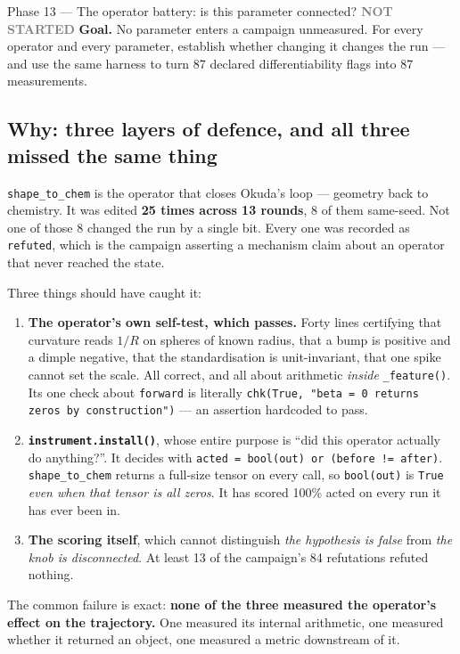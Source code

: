 \documentclass[11pt,a4paper]{article}
\newcommand{\code}[1]{\texttt{#1}}
\newcommand{\todo}{\textcolor{grey}{\textbf{NOT STARTED}}}
\begin{document}
\begin{phasebox}{Phase 13 --- The operator battery: is this parameter connected? \hfill \todo}
\textbf{Goal.} No parameter enters a campaign unmeasured. For every operator and every parameter,
establish whether changing it changes the run --- and use the same harness to turn 87 declared
differentiability flags into 87 measurements.

\subsection*{Why: three layers of defence, and all three missed the same thing}
\code{shape\_to\_chem} is the operator that closes Okuda's loop --- geometry back to chemistry. It
was edited \textbf{25 times across 13 rounds}, 8 of them same-seed. Not one of those 8 changed the
run by a single bit. Every one was recorded as \code{refuted}, which is the campaign asserting a
mechanism claim about an operator that never reached the state.

Three things should have caught it:

\begin{enumerate}[leftmargin=1.4em]
\item \textbf{The operator's own self-test, which passes.} Forty lines certifying that curvature
reads $1/R$ on spheres of known radius, that a bump is positive and a dimple negative, that the
standardisation is unit-invariant, that one spike cannot set the scale. All correct, and all about
arithmetic \emph{inside} \code{\_feature()}. Its one check about \code{forward} is literally
\code{chk(True, "beta = 0 returns zeros by construction")} --- an assertion hardcoded to pass.
\item \textbf{\code{instrument.install()}}, whose entire purpose is ``did this operator actually do
anything?''. It decides with \code{acted = bool(out) or (before != after)}. \code{shape\_to\_chem}
returns a full-size tensor on every call, so \code{bool(out)} is \code{True} \emph{even when that
tensor is all zeros}. It has scored 100\% acted on every run it has ever been in.
\item \textbf{The scoring itself}, which cannot distinguish \emph{the hypothesis is false} from
\emph{the knob is disconnected}. At least 13 of the campaign's 84 refutations refuted nothing.
\end{enumerate}

\noindent The common failure is exact: \textbf{none of the three measured the operator's effect on
the trajectory.} One measured its internal arithmetic, one measured whether it returned an object,
one measured a metric downstream of it.


\end{phasebox}
\end{document}
